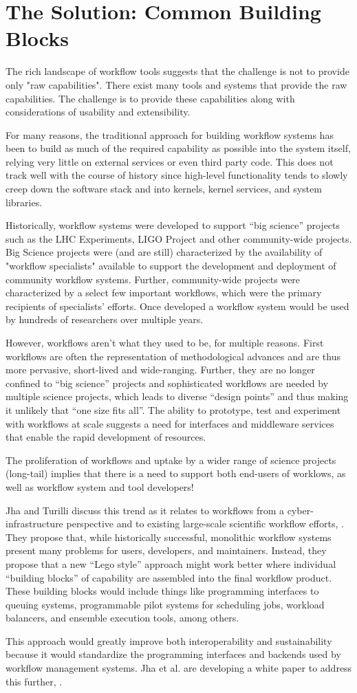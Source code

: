 \section{The Solution: Common Building Blocks}\label{buildings-blocks}

The rich landscape of workflow tools suggests that the  challenge is not to
provide only "raw capabilities". There exist many tools and systems that
provide the raw capabilities. The challenge is to provide these capabilities
along with considerations of usability and extensibility.

For many reasons, the traditional approach for building workflow systems has
been to build as much of the required capability as possible into the system
itself, relying very little on external services or even third party code.
This does not track well with the course of history since  high-level
functionality tends to slowly creep down the software stack and into kernels,
kernel services, and system libraries.

Historically, workflow systems were developed to support “big science”
projects such as the LHC Experiments, LIGO Project and other community-wide
projects. Big Science projects were (and are still) characterized by the
availability of "workflow specialists" available to support the  development
and deployment of community workflow systems. Further, community-wide projects
were characterized by a select few important workflows, which were the primary
recipients of  specialists' efforts. Once developed a workflow system would
be used by hundreds of researchers over multiple years.

However, workflows aren’t what they used to be, for multiple reasons. First
workflows are often the representation of methodological advances and are thus
more pervasive, short-lived and wide-ranging. Further, they are no longer
confined to “big science” projects and sophisticated workflows are needed by
multiple science projects, which leads to diverse “design points” and thus
making it unlikely that “one size fits all”.  The ability to prototype, test
and experiment with workflows at scale suggests a need for interfaces and
middleware services that enable the rapid development of resources.

The proliferation of workflows and uptake by a wider range of science projects
(long-tail) implies that there is a need to support both end-users of worklows,
as well as workflow system and tool developers!

Jha and Turilli discuss this trend as it relates to workflows from a 
cyber-infrastructure perspective and to existing large-scale scientific workflow
efforts, \cite{jha_building_2016}. They propose that, while historically
successful, monolithic workflow systems present many problems for users,
developers, and maintainers. Instead, they propose that a new ``Lego style''
approach might work better where individual ``building blocks'' of capability
are assembled into the final workflow product. These building blocks would
include things like programming interfaces to queuing systems, programmable
pilot systems for scheduling jobs, workload balancers, and ensemble execution
tools, among others.

This approach would greatly improve both interoperability and sustainability
because it would standardize the programming interfaces and backends used by
workflow management systems. Jha et al. are developing a white paper to address
this further, \cite{jha_towards_2016}.

